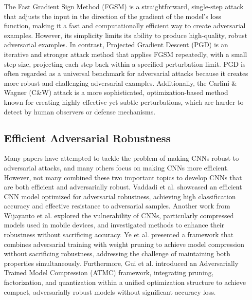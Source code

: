 \documentclass[journal,onecolumn,12pt]{IEEEtran}
\begin{document}
The Fast Gradient Sign Method (FGSM) is a straightforward, single-step attack that adjusts the input in the direction of the gradient of the model's loss function, making it a fast and computationally efficient way to create adversarial examples. However, its simplicity limits its ability to produce high-quality, robust adversarial examples. In contrast, Projected Gradient Descent (PGD) is an iterative and stronger attack method that applies FGSM repeatedly, with a small step size, projecting each step back within a specified perturbation limit. PGD is often regarded as a universal benchmark for adversarial attacks because it creates more robust and challenging adversarial examples. Additionally, the Carlini \& Wagner (C\&W) attack is a more sophisticated, optimization-based method known for creating highly effective yet subtle perturbations, which are harder to detect by human observers or defense mechanisms. 

\subsection{Efficient Adversarial Robustness}
Many papers have attempted to tackle the problem of making CNNs robust to adversarial attacks, and many others focus on making CNNs more efficient. However, not many combined these two important topics to develop CNNs that are both efficient and adversarially robust. Vaddadi et al. showcased an efficient CNN model optimized for adversarial robustness, achieving high classification accuracy and effective resistance to adversarial samples. Another work from Wijayanto et al. explored the vulnerability of CNNs, particularly compressed models used in mobile devices, and investigated methods to enhance their robustness without sacrificing accuracy. Ye et al. presented a framework that combines adversarial training with weight pruning to achieve model compression without sacrificing robustness, addressing the challenge of maintaining both properties simultaneously. Furthermore, Gui et al. introduced an Adversarially Trained Model Compression (ATMC) framework, integrating pruning, factorization, and quantization within a unified optimization structure to achieve compact, adversarially robust models without significant accuracy loss. 


\end{document}
